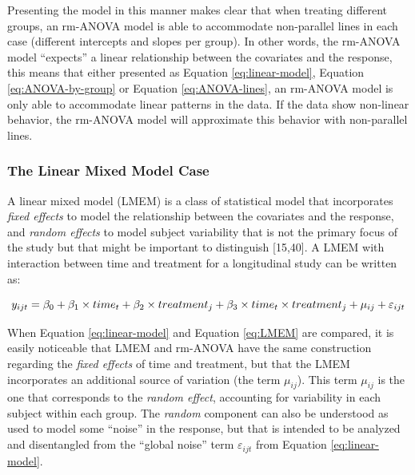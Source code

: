 \documentclass[
]{article}
\begin{document}
Presenting the model in this manner makes clear that when treating different groups, an rm-ANOVA model is able to accommodate non-parallel lines in each case (different intercepts and slopes per group). In other words, the rm-ANOVA model ``expects'' a linear relationship between the covariates and the response, this means that either presented as Equation \eqref{eq:linear-model}, Equation \eqref{eq:ANOVA-by-group} or Equation \eqref{eq:ANOVA-lines}, an rm-ANOVA model is only able to accommodate linear patterns in the data. If the data show non-linear behavior, the rm-ANOVA model will approximate this behavior with non-parallel lines.

\hypertarget{the-linear-mixed-model-case}{%
\subsubsection{The Linear Mixed Model Case}\label{the-linear-mixed-model-case}}

A linear mixed model (LMEM) is a class of statistical model that incorporates \emph{fixed effects} to model the relationship between the covariates and the response, and \emph{random effects} to model subject variability that is not the primary focus of the study but that might be important to distinguish {[}15,40{]}. A LMEM with interaction between time and treatment for a longitudinal study can be written as:

\begin{equation}
y_{ijt} = \beta_0+ \beta_1 \times time_{t} + \beta_2 \times treatment_{j} + \beta_3 \times time_{t}\times treatment_{j}+\mu_{ij} +\varepsilon_{ijt}\\ 
\label{eq:LMEM}
\end{equation}

When Equation \eqref{eq:linear-model} and Equation \eqref{eq:LMEM} are compared, it is easily noticeable that LMEM and rm-ANOVA have the same construction regarding the \emph{fixed effects} of time and treatment, but that the LMEM incorporates an additional source of variation (the term \(\mu_{ij}\)). This term \(\mu_{ij}\) is the one that corresponds to the \emph{random effect}, accounting for variability in each subject within each group. The \emph{random} component can also be understood as used to model some ``noise'' in the response, but that is intended to be analyzed and disentangled from the ``global noise'' term \(\varepsilon_{ijt}\) from Equation \eqref{eq:linear-model}.
\end{document}
